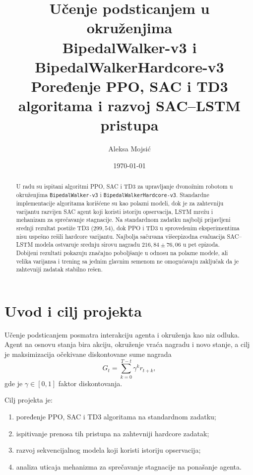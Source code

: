 \documentclass[11pt,a4paper]{article}
\title{\textbf{Učenje podsticanjem u okruženjima\\
BipedalWalker-v3 i BipedalWalkerHardcore-v3}\\[0.5em]
\large Poređenje PPO, SAC i TD3 algoritama i razvoj SAC--LSTM pristupa}
\author{Aleksa Mojsić}
\date{\today}
\begin{document}
\maketitle

\begin{abstract}
U radu su ispitani algoritmi PPO, SAC i TD3 za upravljanje dvonožnim robotom
u okruženjima \texttt{BipedalWalker-v3} i
\texttt{BipedalWalkerHardcore-v3}. Standardne implementacije algoritama
korišćene su kao polazni modeli, dok je za zahtevniju varijantu razvijen
SAC agent koji koristi istoriju opservacija, LSTM mrežu i mehanizam za
sprečavanje stagnacije. Na standardnom zadatku najbolji prijavljeni srednji
rezultat postiže TD3 (\(299{,}54\)), dok PPO i TD3 u sprovedenim
eksperimentima nisu uspešno rešili hardcore varijantu. Najbolja sačuvana
višeepizodna evaluacija SAC--LSTM modela ostvaruje srednju sirovu nagradu
\(216{,}84\pm76{,}06\) u pet epizoda. Dobijeni rezultati pokazuju značajno
poboljšanje u odnosu na polazne modele, ali velika varijansa i trening sa
jednim glavnim semenom ne omogućavaju zaključak da je zahtevniji zadatak
stabilno rešen.
\end{abstract}

\newpage
\tableofcontents
\newpage

\section{Uvod i cilj projekta}

Učenje podsticanjem posmatra interakciju agenta i okruženja kao niz
odluka. Agent na osnovu stanja bira akciju, okruženje vraća nagradu i
novo stanje, a cilj je maksimizacija očekivane diskontovane sume nagrada
\begin{equation}
  G_t=\sum_{k=0}^{T-t}\gamma^k r_{t+k},
\end{equation}
gde je \(\gamma\in[0,1]\) faktor diskontovanja.

Cilj projekta je:
\begin{enumerate}
  \item poređenje PPO, SAC i TD3 algoritama na standardnom zadatku;
  \item ispitivanje prenosa tih pristupa na zahtevniji hardcore zadatak;
  \item razvoj sekvencijalnog modela koji koristi istoriju opservacija;
  \item analiza uticaja mehanizma za sprečavanje stagnacije na ponašanje agenta.
\end{enumerate}
\end{document}
